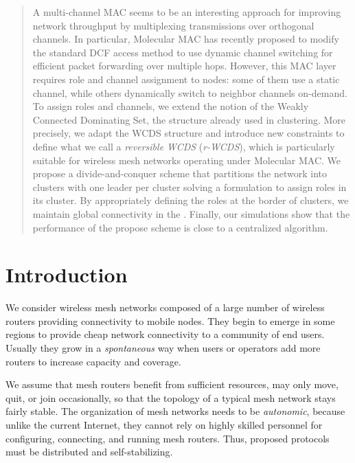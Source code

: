 \documentclass[twoside]{article}
\begin{document}
\begin{abstract}
A multi-channel MAC seems to be an interesting approach for improving network throughput by multiplexing transmissions over orthogonal channels. In particular, Molecular MAC has recently proposed to modify the standard \ieee DCF access method to use dynamic channel switching for efficient packet forwarding over multiple hops. However, this MAC layer requires role and channel assignment to nodes: some of them use a static channel, while others dynamically switch to neighbor channels on-demand. To assign roles and channels, we extend the notion of the Weakly Connected Dominating Set, the structure already used in clustering. More precisely, we adapt the WCDS structure and introduce new constraints to define what we call a \emph{reversible WCDS} (\emph{r-WCDS}), which is particularly suitable for wireless mesh networks operating under Molecular MAC. We propose a divide-and-conquer scheme that partitions the network into clusters with one leader per cluster solving a \milp formulation to assign roles in its cluster. By appropriately defining the roles at the border of clusters, we maintain global connectivity in the \rwcds. Finally, our simulations show that the performance of the propose scheme is close to a centralized algorithm.
\end{abstract} 












\section{Introduction}


We consider wireless mesh networks composed of a large number of wireless routers providing connectivity to mobile nodes. They begin to emerge in some regions to provide cheap network connectivity to a community of end users. Usually they grow in a {\em spontaneous} way when users or operators add more routers to increase capacity and coverage.

We assume that mesh routers benefit from sufficient resources, may
only move, quit, or join occasionally, so that the topology of a
typical mesh network stays fairly stable.  The organization of mesh
networks needs to be {\em autonomic}, because unlike the current
Internet, they cannot rely on highly skilled personnel for
configuring, connecting, and running mesh routers. Thus, proposed
protocols must be distributed and self-stabilizing.
\end{document}
